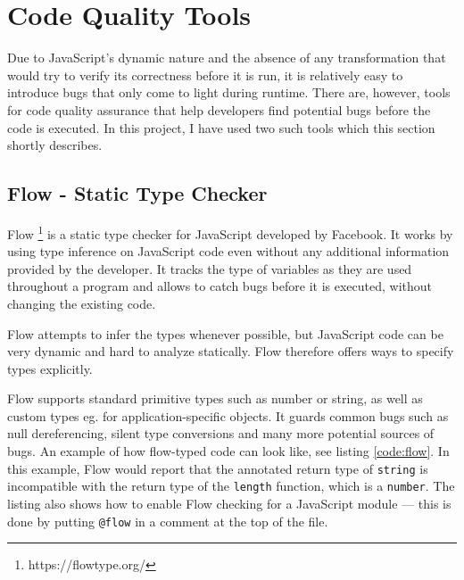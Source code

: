 \section{Code Quality Tools}

Due to JavaScript's dynamic nature and the absence of any transformation that would try to verify its correctness before it is run, it is relatively easy to introduce bugs that only come to light during runtime. There are, however, tools for code quality assurance that help developers find potential bugs before the code is executed. In this project, I have used two such tools which this section shortly describes.

\subsection{Flow - Static Type Checker}

Flow  \footnote{https://flowtype.org/} is a static type checker for JavaScript developed by Facebook. It works by using type inference on JavaScript code even without any additional information provided by the developer. It tracks the type of variables as they are used throughout a program and allows to catch bugs before it is executed, without changing the existing code. 

Flow attempts to infer the types whenever possible, but JavaScript code can be very dynamic and hard to analyze statically. Flow therefore offers ways to specify types explicitly.

Flow supports standard primitive types such as number or string, as well as custom types eg. for application-specific objects. It guards common bugs such as null dereferencing, silent type conversions and many more potential sources of bugs. An example of how flow-typed code can look like, see listing \ref{code:flow}. In this example, Flow would report that the annotated return type of \texttt{string} is incompatible with the return type of the \texttt{length} function, which is a \texttt{number}. The listing also shows how to enable Flow checking for a JavaScript module --- this is done by putting \texttt{@flow} in a comment at the top of the file.






